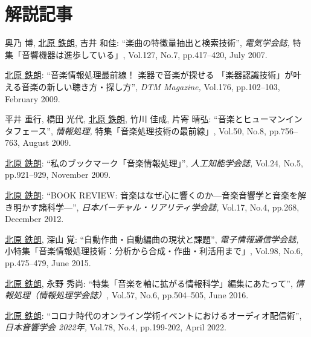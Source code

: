 \section*{解説記事}
\begin{Enumerate}
  
\item 
奥乃 博, 
\underline{北原 鉄朗}, 
吉井 和佳: 
    ``楽曲の特徴量抽出と検索技術'', 
    {\it 電気学会誌,
    } 特集「音響機器は進歩している」, Vol.127, No.7, pp.417--420, July 2007. 

\item 
\underline{北原 鉄朗}: 
    ``音楽情報処理最前線！ 楽器で音楽が探せる 「楽器認識技術」が叶える音楽の新しい聴き方・探し方'', 
    {\it DTM Magazine,
    } Vol.176, pp.102--103, February 2009. 

\item 
平井 重行, 
橋田 光代, 
\underline{北原 鉄朗}, 
竹川 佳成, 
片寄 晴弘: 
    ``音楽とヒューマンインタフェース'', 
    {\it 情報処理,
    } 特集「音楽処理技術の最前線」, Vol.50, No.8, pp.756--763, August 2009. 

\item 
\underline{北原 鉄朗}: 
    ``私のブックマーク「音楽情報処理」'', 
    {\it 人工知能学会誌,
    } Vol.24, No.5, pp.921--929, November 2009. 

\item 
\underline{北原 鉄朗}: 
    ``BOOK REVIEW: 音楽はなぜ心に響くのか---音楽音響学と音楽を解き明かす諸科学---'', 
    {\it 日本バーチャル・リアリティ学会誌,
    } Vol.17, No.4, pp.268, December 2012. 

\item 
\underline{北原 鉄朗}, 
深山 覚: 
    ``自動作曲・自動編曲の現状と課題'', 
    {\it 電子情報通信学会誌,
    } 小特集「音楽情報処理技術：分析から合成・作曲・利活用まで」, Vol.98, No.6, pp.475--479, June 2015. 

\item 
\underline{北原 鉄朗}, 
永野 秀尚: 
    ``特集「音楽を軸に拡がる情報科学」編集にあたって'', 
    {\it 情報処理（情報処理学会誌）,
    } Vol.57, No.6, pp.504--505, June 2016. 

\item 
\underline{北原 鉄朗}: 
    ``コロナ時代のオンライン学術イベントにおけるオーディオ配信術'', 
    {\it 日本音響学会 2022年,
    } Vol.78, No.4, pp.199-202, April 2022. 

\end{Enumerate}

